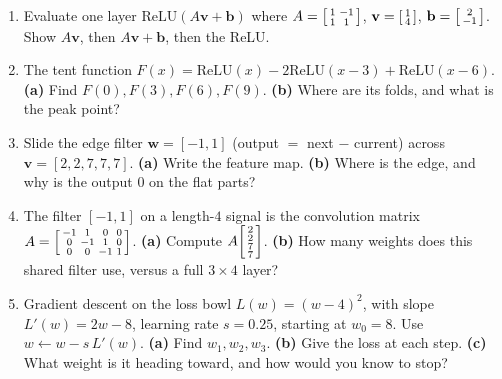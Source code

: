 \documentclass[10pt]{article}
\newcommand{\vv}{\mathbf{v}}
\newcommand{\bb}{\mathbf{b}}
\newcommand{\ww}{\mathbf{w}}
\newcommand{\relu}{\mathrm{ReLU}}
\begin{document}
\begin{enumerate}[leftmargin=1.9em, itemsep=12pt]
  \item Evaluate one layer $\relu(A\vv+\bb)$ where
        $A=\begin{bsmallmatrix}1&-1\\1&1\end{bsmallmatrix}$, $\vv=\begin{bsmallmatrix}1\\4\end{bsmallmatrix}$,
        $\bb=\begin{bsmallmatrix}2\\-1\end{bsmallmatrix}$. Show $A\vv$, then $A\vv+\bb$, then the ReLU.
        \vspace{2.6cm}
  \item The tent function $F(x)=\relu(x)-2\relu(x-3)+\relu(x-6)$.
        \textbf{(a)} Find $F(0),F(3),F(6),F(9)$. \textbf{(b)} Where are its folds, and what is the peak point?
        \vspace{2.8cm}
  \item Slide the edge filter $\ww=[-1,1]$ (output $=$ next $-$ current) across $\vv=[2,2,7,7,7]$.
        \textbf{(a)} Write the feature map. \textbf{(b)} Where is the edge, and why is the output $0$ on the flat parts?
        \vspace{2.6cm}
  \item The filter $[-1,1]$ on a length-$4$ signal is the convolution matrix
        $A=\begin{bsmallmatrix}-1&1&0&0\\0&-1&1&0\\0&0&-1&1\end{bsmallmatrix}$.
        \textbf{(a)} Compute $A\begin{bsmallmatrix}2\\2\\7\\7\end{bsmallmatrix}$.
        \textbf{(b)} How many weights does this shared filter use, versus a full $3\times4$ layer?
        \vspace{2.8cm}
  \item Gradient descent on the loss bowl $L(w)=(w-4)^2$, with slope $L'(w)=2w-8$, learning rate $s=0.25$,
        starting at $w_0=8$. Use $w\leftarrow w-s\,L'(w)$.
        \textbf{(a)} Find $w_1,w_2,w_3$. \textbf{(b)} Give the loss at each step. \textbf{(c)} What weight is it heading toward, and how would you know to stop?
        \vspace{3.0cm}

\end{enumerate}
\end{document}
